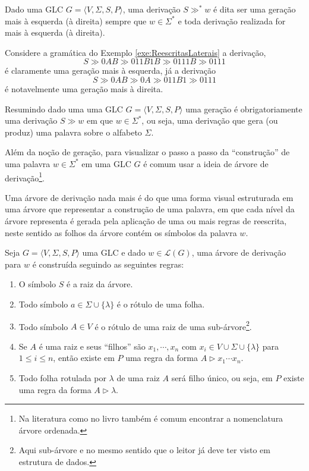 \begin{definition}\label{def:TipoGeracao}
	Dado uma GLC $G = \langle V, \Sigma, S, P\rangle$,  uma derivação $S \gg^* w$ é dita ser uma geração mais à esquerda (à direita) sempre que $w \in \Sigma^*$ e toda derivação realizada for mais à esquerda (à direita).
\end{definition}

\begin{example}\label{exe:TipoGeracao}
	Considere a gramática do Exemplo \ref{exe:ReescritasLaterais} a derivação, 
	$$S \gg 0AB \gg 011B1B \gg 0111B \gg 0111$$
	é claramente uma geração mais à esquerda, já a derivação
	$$S \gg 0AB \gg 0A \gg 011B1 \gg 0111$$
	é notavelmente uma geração mais à direita.
\end{example}

\begin{remark}
  Resumindo dado uma uma GLC $G = \langle V, \Sigma, S, P\rangle$ uma geração é obrigatoriamente uma derivação $S \gg w$ em que $w \in \Sigma^*$, ou seja, uma derivação que gera (ou produz) uma palavra sobre o alfabeto $\Sigma$.
\end{remark}

Além da noção de geração, para visualizar o passo a passo da ``construção'' de uma palavra $w \in \Sigma^*$ em uma GLC $G$ é comum usar a ideia de árvore de derivação\footnote{Na literatura como no livro \cite{benjaLivro2010} também é comum encontrar a nomenclatura árvore ordenada.}. 

Uma árvore de derivação nada mais é do que uma forma visual estruturada em uma árvore que representar a construção de uma palavra, em que cada nível da árvore representa é gerada pela aplicação de uma ou mais regras de reescrita, neste sentido as folhos da árvore contém os símbolos da palavra $w$.

\begin{definition}\label{def:ArvoreGLC}
	Seja $G = \langle V, \Sigma, S, P\rangle$ uma GLC e dado $w \in \mathcal{L}(G)$, uma árvore de derivação para $w$ é construída seguindo as seguintes regras:
	\begin{enumerate}
		\item O símbolo $S$ é a raiz da árvore.
		\item Todo símbolo $a \in \Sigma \cup \{\lambda\}$ é o rótulo de uma folha.
		\item Todo símbolo $A \in V$ é o rótulo de uma raiz de uma sub-árvore\footnote{Aqui sub-árvore e no mesmo sentido que o leitor já deve ter visto em estrutura de dados.}.
		\item Se $A$ é uma raiz e seus ``filhos'' são  $x_1, \cdots, x_n$ com $x_i \in V \cup \Sigma \cup \{\lambda\}$ para $1 \leq i \leq n$, então existe em $P$ uma regra da forma $A \rhd x_1\cdots x_n$.
		\item Todo folha rotulada por $\lambda$ de uma raiz $A$ será filho único, ou seja, em $P$ existe uma regra da forma $A \rhd \lambda$.
	\end{enumerate}
\end{definition}

